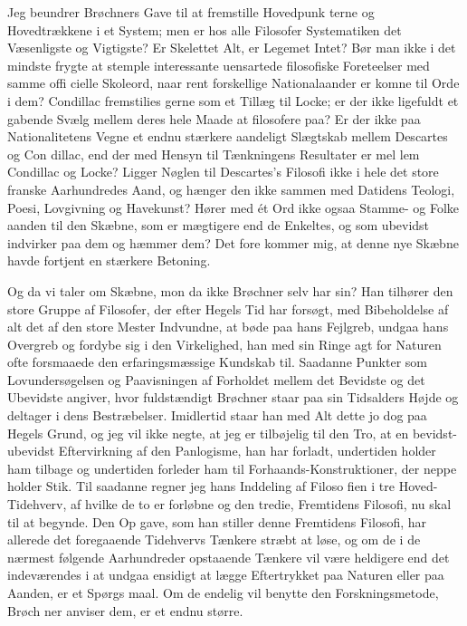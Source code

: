 \documentclass[12pt,a4paper,openany]{book}
\newcommand{\opage}[1]{\marginnote{\footnotesize\textit{[#1]}}}
\begin{document}
Jeg beundrer Brøchners Gave til at fremstille Hovedpunk\-%
terne og Hovedtrækkene i et System; men er hos alle Filosofer
\opage{121}Systematiken det Væsenligste og Vigtigste? Er Skelettet Alt, er
Legemet Intet? Bør man ikke i det mindste frygte at stemple
interessante uensartede filosofiske Foreteelser med samme offi\-%
cielle Skoleord, naar rent forskellige Nationalaander er komne
til Orde i dem? Condillac fremstilies gerne som et Tillæg til
Locke; er der ikke ligefuldt et gabende Svælg mellem deres hele
Maade at filosofere paa? Er der ikke paa Nationalitetens Vegne
et endnu stærkere aandeligt Slægtskab mellem Descartes og Con\-%
dillac, end der med Hensyn til Tænkningens Resultater er mel\-%
lem Condillac og Locke? Ligger Nøglen til Descartes's Filosofi
ikke i hele det store franske Aarhundredes Aand, og hænger
den ikke sammen med Datidens Teologi, Poesi, Lovgivning og
Havekunst? Hører med ét Ord ikke ogsaa Stamme- og Folke\-%
aanden til den Skæbne, som er mægtigere end de Enkeltes, og
som ubevidst indvirker paa dem og hæmmer dem? Det fore\-%
kommer mig, at denne nye Skæbne havde fortjent en stærkere
Betoning.

Og da vi taler om Skæbne, mon da ikke Brøchner selv
har sin? Han tilhører den store Gruppe af Filosofer, der efter
Hegels Tid har forsøgt, med Bibeholdelse af alt det af den store
Mester Indvundne, at bøde paa hans Fejlgreb, undgaa hans
Overgreb og fordybe sig i den Virkelighed, han med sin Ringe\-%
agt for Naturen ofte forsmaaede den erfaringsmæssige Kundskab
til. Saadanne Punkter som Lovundersøgelsen og Paavisningen
af Forholdet mellem det Bevidste og det Ubevidste angiver,
hvor fuldstændigt Brøchner staar paa sin Tidsalders Højde
og deltager i dens Bestræbelser. Imidlertid staar han med Alt
dette jo dog paa Hegels Grund, og jeg vil ikke negte, at jeg er
tilbøjelig til den Tro, at en bevidst-ubevidst Eftervirkning af den
Panlogisme, han har forladt, undertiden holder ham tilbage og
undertiden forleder ham til Forhaands-Konstruktioner, der neppe
holder Stik. Til saadanne regner jeg hans Inddeling af Filoso\-%
fien i tre Hoved-Tidehverv, af hvilke de to er forløbne og den
tredie, Fremtidens Filosofi, nu skal til at begynde. Den Op\-%
gave, som han stiller denne Fremtidens Filosofi, har allerede
det foregaaende Tidehvervs Tænkere stræbt at løse, og om de
i de nærmest følgende Aarhundreder opstaaende Tænkere vil
være heldigere end det indeværendes i at undgaa ensidigt at
lægge Eftertrykket paa Naturen eller paa Aanden, er et Spørgs%
\opage{122}maal. Om de endelig vil benytte den Forskningsmetode, Brøch\-%
ner anviser dem, er et endnu større.
\end{document}

